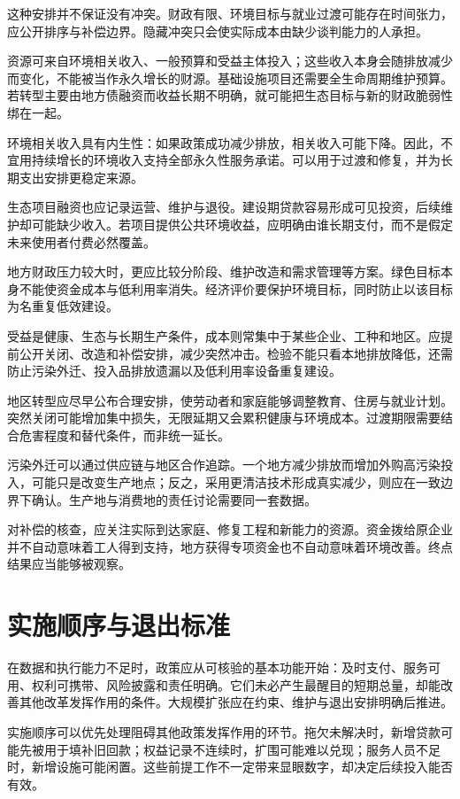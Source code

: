 \documentclass[UTF8,fontset=fandol,zihao=-4,oneside,openany]{ctexbook}
\begin{document}
这种安排并不保证没有冲突。财政有限、环境目标与就业过渡可能存在时间张力，应公开排序与补偿边界。隐藏冲突只会使实际成本由缺少谈判能力的人承担。

资源可来自环境相关收入、一般预算和受益主体投入；这些收入本身会随排放减少而变化，不能被当作永久增长的财源。基础设施项目还需要全生命周期维护预算。若转型主要由地方债融资而收益长期不明确，就可能把生态目标与新的财政脆弱性绑在一起。

\label{arg:P275}
环境相关收入具有内生性：如果政策成功减少排放，相关收入可能下降。因此，不宜用持续增长的环境收入支持全部永久性服务承诺。可以用于过渡和修复，并为长期支出安排更稳定来源。

生态项目融资也应记录运营、维护与退役。建设期贷款容易形成可见投资，后续维护却可能缺少收入。若项目提供公共环境收益，应明确由谁长期支付，而不是假定未来使用者付费必然覆盖。

地方财政压力较大时，更应比较分阶段、维护改造和需求管理等方案。绿色目标本身不能使资金成本与低利用率消失。经济评价要保护环境目标，同时防止以该目标为名重复低效建设。

受益是健康、生态与长期生产条件，成本则常集中于某些企业、工种和地区。应提前公开关闭、改造和补偿安排，减少突然冲击。检验不能只看本地排放降低，还需防止污染外迁、投入品排放遗漏以及低利用率设备重复建设。

\label{arg:P276}
地区转型应尽早公布合理安排，使劳动者和家庭能够调整教育、住房与就业计划。突然关闭可能增加集中损失，无限延期又会累积健康与环境成本。过渡期限需要结合危害程度和替代条件，而非统一延长。

污染外迁可以通过供应链与地区合作追踪。一个地方减少排放而增加外购高污染投入，可能只是改变生产地点；反之，采用更清洁技术形成真实减少，则应在一致边界下确认。生产地与消费地的责任讨论需要同一套数据。

对补偿的核查，应关注实际到达家庭、修复工程和新能力的资源。资金拨给原企业并不自动意味着工人得到支持，地方获得专项资金也不自动意味着环境改善。终点结果应当能够被观察。

\section{实施顺序与退出标准}
在数据和执行能力不足时，政策应从可核验的基本功能开始：及时支付、服务可用、权利可携带、风险披露和责任明确。它们未必产生最醒目的短期总量，却能改善其他改革发挥作用的条件。大规模扩张应在约束、维护与退出安排明确后推进。

\label{arg:P277}
实施顺序可以优先处理阻碍其他政策发挥作用的环节。拖欠未解决时，新增贷款可能先被用于填补旧回款；权益记录不连续时，扩围可能难以兑现；服务人员不足时，新增设施可能闲置。这些前提工作不一定带来显眼数字，却决定后续投入能否有效。
\end{document}
